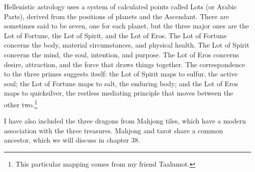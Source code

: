 \documentclass[openright]{book}
\begin{document}
Hellenistic astrology uses a system of calculated points called Lots (or Arabic Parts), derived from the positions of planets and the Ascendant. There are sometimes said to be seven, one for each planet, but the three major ones are the Lot of Fortune, the Lot of Spirit, and the Lot of Eros. The Lot of Fortune concerns the body, material circumstances, and physical health. The Lot of Spirit concerns the mind, the soul, intention, and purpose. The Lot of Eros concerns desire, attraction, and the force that draws things together. The correspondence to the three primes suggests itself: the Lot of Spirit maps to sulfur, the active soul; the Lot of Fortune maps to salt, the enduring body; and the Lot of Eros maps to quicksilver, the restless mediating principle that moves between the other two.\footnote{This particular mapping comes from my friend Taalumot.}

I have also included the three dragons from Mahjong tiles, which have a modern association with the three treasures. Mahjong and tarot share a common ancestor, which we will discuss in chapter 38.

\newcommand{\acemini}[3]{%
  \begin{tikzpicture}[baseline=-0.5ex]
    \draw[black!60, rounded corners=0.6mm, fill=white] (-3.2mm,-4.5mm) rectangle (3.2mm,4.5mm);
    \node[anchor=center] at (0,-1mm) {#1};
    \foreach \angle in {0,45,...,315}{%
      \node[anchor=north west, text=white, font=\fontsize{5}{6}\selectfont,
        inner sep=0.3mm, xshift={0.12*cos(\angle)*1mm}, yshift={0.12*sin(\angle)*1mm}]
        at (-3mm,4.5mm) {{\rankfont A}{\symbfont #3}};
    }%
    \node[anchor=north west, text=#2, font=\fontsize{5}{6}\selectfont,
      inner sep=0.3mm] at (-3mm,4.5mm) {{\rankfont A}{\symbfont #3}};
  \end{tikzpicture}%
}

\newcommand{\primemini}[2]{%
  \begin{tikzpicture}[baseline=-0.5ex]
    \draw[black!60, rounded corners=0.6mm, fill=white] (-3.2mm,-4.5mm) rectangle (3.2mm,4.5mm);
    \node[anchor=center] at (0,-0.5mm) {#1};
    \foreach \angle in {0,45,...,315}{%
      \node[anchor=north, text=white, font=\cardfont\fontsize{4}{5}\selectfont,
        inner sep=0.3mm, xshift={0.12*cos(\angle)*1mm}, yshift={0.12*sin(\angle)*1mm}]
        at (0,4.5mm) {#2};
    }%
    \node[anchor=north, text=black, font=\cardfont\fontsize{4}{5}\selectfont,
      inner sep=0.3mm] at (0,4.5mm) {#2};
  \end{tikzpicture}%
}
\end{document}
